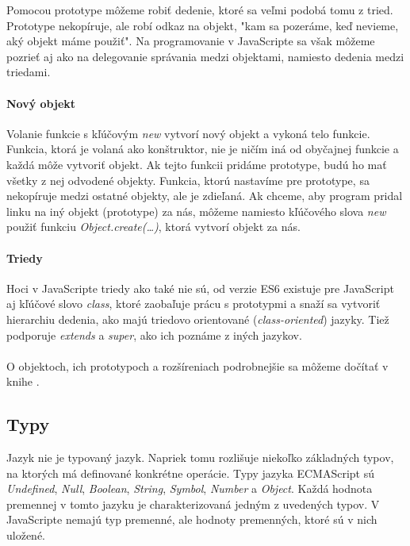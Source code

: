 Pomocou prototype môžeme robiť dedenie, ktoré sa veľmi podobá tomu z tried. Prototype nekopíruje, ale robí odkaz na objekt, "kam sa pozeráme, keď nevieme, aký objekt máme použiť".
Na programovanie v JavaScripte sa však môžeme pozrieť aj ako na delegovanie správania medzi objektami, namiesto dedenia medzi triedami.

\paragraph{Nový objekt}
Volanie funkcie s kľúčovým \emph{new} vytvorí nový objekt a vykoná telo funkcie. Funkcia, ktorá je volaná ako konštruktor, nie je ničím iná od obyčajnej funkcie a každá môže vytvoriť objekt.
Ak tejto funkcii pridáme prototype, budú ho mať všetky z nej odvodené objekty. Funkcia, ktorú nastavíme pre prototype, sa nekopíruje medzi ostatné objekty, ale je zdieľaná.
Ak chceme, aby program pridal linku na iný objekt (prototype) za nás, môžeme namiesto kľúčového slova \emph{new} použiť funkciu \emph{Object.create(\ldots)}, ktorá vytvorí objekt za nás.

\paragraph{Triedy}
Hoci v JavaScripte triedy ako také nie sú, od verzie ES6 existuje pre JavaScript aj kľúčové slovo \emph{class}, ktoré zaobaľuje prácu s prototypmi a snaží sa vytvoriť hierarchiu dedenia, ako majú triedovo orientované (\emph{class-oriented}) jazyky. Tiež podporuje \emph{extends} a \emph{super}, ako ich poznáme z iných jazykov.

\paragraph{}
O objektoch, ich prototypoch a rozšíreniach podrobnejšie sa môžeme dočítať v knihe \cite[this \& Object Prototypes]{youDontKnowJS3}.

\subsection{Typy}
Jazyk \JS{} nie je typovaný jazyk. Napriek tomu rozlišuje niekoľko základných typov, na ktorých má definované konkrétne operácie. Typy jazyka ECMAScript sú \emph{Undefined}, \emph{Null}, \emph{Boolean}, \emph{String}, \emph{Symbol}, \emph{Number} a \emph{Object}. Každá hodnota premennej v tomto jazyku je charakterizovaná jedným z uvedených typov. V JavaScripte nemajú typ premenné, ale hodnoty premenných, ktoré sú v nich uložené. 

